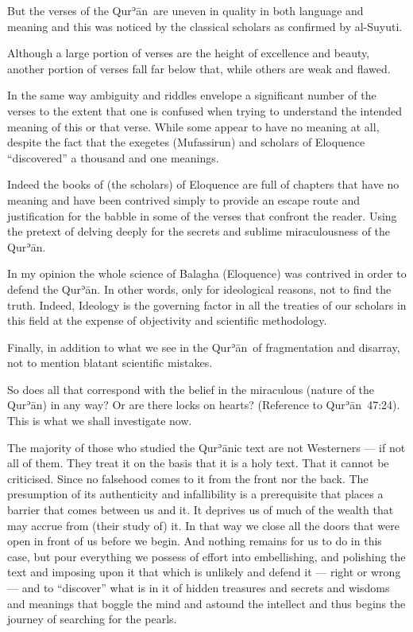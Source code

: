 \documentclass[12pt]{memoir}
\def\´{ʾ} %
\def \Quran{Qur\-\´ān} %
\def\–{-\hskip0pt}
\newcommand{\QRef}[1]{{\color{darkblue}#1}}
\begin{document}
But the verses of the \Quran\ are uneven in quality
in both language and meaning and this was noticed
by the classical scholars as confirmed by al\–Suyuti.

Although a large portion of verses are the height of excellence and beauty,
another portion of verses fall far below that,
while others are weak and flawed.

In the same way ambiguity and riddles envelope a significant number of
the verses to the extent that one is confused when trying to understand
the intended meaning of this or that verse.
While some appear to have no meaning at all,
despite the fact that the exegetes (Mufassirun) and
scholars of Eloquence “discovered” a thousand and one meanings.

Indeed the books of (the scholars) of Eloquence are full of chapters
that have no meaning and have been contrived simply to provide an escape
route and justification for the babble in some of the verses
that confront the reader.
Using the pretext of delving deeply for the secrets
and sublime miraculousness of the \Quran.

In my opinion the whole science of Balagha (Eloquence)
was contrived in order to defend the \Quran.
In other words, only for ideological reasons, not to find the truth.
Indeed, Ideology is the governing factor in all the treaties of our scholars
in this field at the expense of objectivity and scientific methodology.

Finally, in addition to what we see in the \Quran\ of fragmentation
and disarray, not to mention blatant scientific mistakes.

So does all that correspond with the belief in the miraculous
(nature of the \Quran) in any way?
Or are there locks on hearts?
(Reference to \Quran\ \QRef{47:24}).
This is what we shall investigate now.

The majority of those who studied the \Quran{}ic text are not Westerners —
if not all of them.
They treat it on the basis that it is a holy text.
That it cannot be criticised.
Since no falsehood comes to it from the front nor the back.
The presumption of its authenticity and infallibility is a prerequisite
that places a barrier that comes between us and it.
It deprives us of much of the wealth that may accrue from (their study of) it.
In that way we close all the doors that were open
in front of us before we begin.
And nothing remains for us to do in this case,
but pour everything we possess of effort into embellishing,
and polishing the text and imposing upon it
that which is unlikely and defend it — right or wrong —
and to “discover” what is in it of hidden treasures and secrets and
wisdoms and meanings that boggle the mind and astound the intellect and
thus begins the journey of searching for the pearls.
\end{document}
